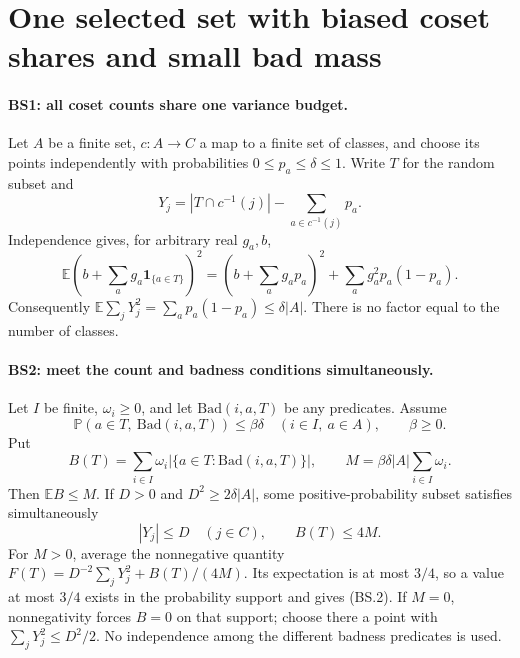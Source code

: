 \section{One selected set with biased coset shares and small bad mass}
\label{sec:balanced-tops}


\paragraph{BS1: all coset counts share one variance budget.}
Let $A$ be a finite set, $c:A\to C$ a map to a finite set of classes,
and choose its points independently with probabilities
$0\le p_a\le\delta\le1$. Write $T$ for the random subset and
\[
 Y_j=|T\cap c^{-1}(j)|-\sum_{a\in c^{-1}(j)}p_a.
\]
Independence gives, for arbitrary real $g_a,b$,
\[
 \mathbb E\left(b+\sum_a g_a\mathbf1_{\{a\in T\}}\right)^2
 =\left(b+\sum_a g_ap_a\right)^2+
       \sum_a g_a^2p_a(1-p_a).
                                                        \tag{BS.1}
\]
Consequently
$\mathbb E\sum_jY_j^2=\sum_ap_a(1-p_a)\le\delta|A|$.
There is no factor equal to the number of classes.

\paragraph{BS2: meet the count and badness conditions simultaneously.}
Let $I$ be finite, $\omega_i\ge0$, and let
$\mathrm{Bad}(i,a,T)$ be any predicates. Assume
\[
 \mathbb P(a\in T,\ \mathrm{Bad}(i,a,T))\le\beta\delta
 \quad(i\in I,\ a\in A),\qquad \beta\ge0.
\]
Put
\[
 B(T)=\sum_{i\in I}\omega_i
         |\{a\in T:\mathrm{Bad}(i,a,T)\}|,\qquad
 M=\beta\delta|A|\sum_{i\in I}\omega_i.
\]
Then $\mathbb EB\le M$. If $D>0$ and $D^2\ge2\delta|A|$,
some positive-probability subset satisfies simultaneously
\[
 |Y_j|\le D\quad(j\in C),\qquad B(T)\le4M.             \tag{BS.2}
\]
For $M>0$, average the nonnegative quantity
$F(T)=D^{-2}\sum_jY_j^2+B(T)/(4M)$.
Its expectation is at most $3/4$, so a value at most $3/4$
exists in the probability support and gives (BS.2).
If $M=0$, nonnegativity forces $B=0$ on that support; choose
there a point with $\sum_jY_j^2\le D^2/2$.
No independence among the different badness predicates is used.

